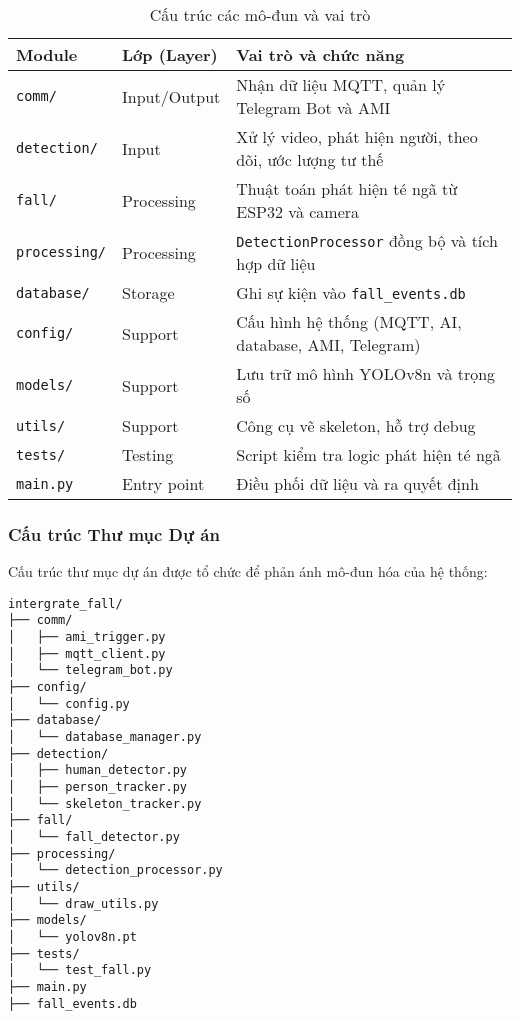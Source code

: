 \begin{table}[H]
\centering
\caption{Cấu trúc các mô-đun và vai trò}
\label{tab:server_modules}
\begin{tabular}{|l|l|p{7cm}|}
\hline
\textbf{Module} & \textbf{Lớp (Layer)} & \textbf{Vai trò và chức năng} \\
\hline
\texttt{comm/} & Input/Output & Nhận dữ liệu MQTT, quản lý Telegram Bot và AMI \\
\hline
\texttt{detection/} & Input & Xử lý video, phát hiện người, theo dõi, ước lượng tư thế \\
\hline
\texttt{fall/} & Processing & Thuật toán phát hiện té ngã từ ESP32 và camera \\
\hline
\texttt{processing/} & Processing & \texttt{DetectionProcessor} đồng bộ và tích hợp dữ liệu \\
\hline
\texttt{database/} & Storage & Ghi sự kiện vào \texttt{fall\_events.db} \\
\hline
\texttt{config/} & Support & Cấu hình hệ thống (MQTT, AI, database, AMI, Telegram) \\
\hline
\texttt{models/} & Support & Lưu trữ mô hình YOLOv8n và trọng số \\
\hline
\texttt{utils/} & Support & Công cụ vẽ skeleton, hỗ trợ debug \\
\hline
\texttt{tests/} & Testing & Script kiểm tra logic phát hiện té ngã \\
\hline
\texttt{main.py} & Entry point & Điều phối dữ liệu và ra quyết định \\
\hline
\end{tabular}
\end{table}

\subsubsection{Cấu trúc Thư mục Dự án}
\label{subsubsec:project_structure}

Cấu trúc thư mục dự án được tổ chức để phản ánh mô-đun hóa của hệ thống:

\begin{verbatim}
intergrate_fall/
├── comm/
│   ├── ami_trigger.py
│   ├── mqtt_client.py
│   └── telegram_bot.py
├── config/
│   └── config.py
├── database/
│   └── database_manager.py
├── detection/
│   ├── human_detector.py
│   ├── person_tracker.py
│   └── skeleton_tracker.py
├── fall/
│   └── fall_detector.py
├── processing/
│   └── detection_processor.py
├── utils/
│   └── draw_utils.py
├── models/
│   └── yolov8n.pt
├── tests/
│   └── test_fall.py
├── main.py
├── fall_events.db
\end{verbatim}

